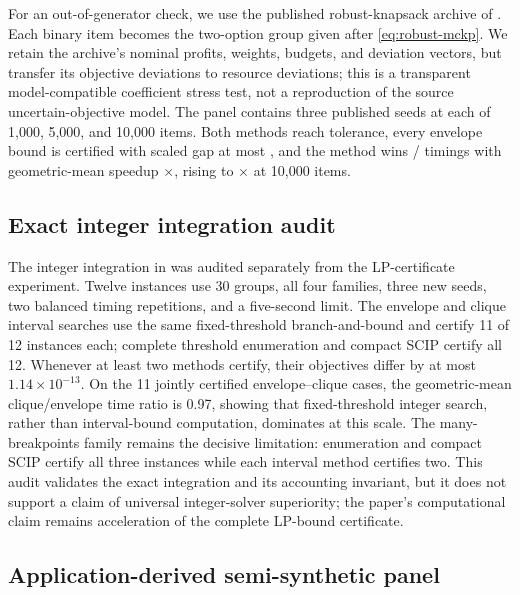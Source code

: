 \documentclass[11pt]{article}
\theoremstyle{plain}
\theoremstyle{definition}
\theoremstyle{remark}
\begin{document}
For an out-of-generator check, we use the published robust-knapsack archive of \citet{GersingData2022}.  Each binary item becomes the two-option group given after \eqref{eq:robust-mckp}.  We retain the archive's nominal profits, weights, budgets, and deviation vectors, but transfer its objective deviations to resource deviations; this is a transparent model-compatible coefficient stress test, not a reproduction of the source uncertain-objective model.  The panel contains three published seeds at each of 1,000, 5,000, and 10,000 items.  Both methods reach tolerance, every envelope bound is certified with scaled gap at most \PubExternalCertGap, and the method wins \PubExternalWins{}/\PubExternalCases{} timings with geometric-mean speedup \PubExternalGeoSpeedup$\times$, rising to \PubExternalNHighSpeedup$\times$ at 10,000 items.

\FloatBarrier

\subsection{Exact integer integration audit}

The integer integration in  was audited separately from the LP-certificate experiment.  Twelve instances use 30 groups, all four families, three new seeds, two balanced timing repetitions, and a five-second limit.  The envelope and clique interval searches use the same fixed-threshold branch-and-bound and certify 11 of 12 instances each; complete threshold enumeration and compact SCIP certify all 12.  Whenever at least two methods certify, their objectives differ by at most $1.14\times10^{-13}$.  On the 11 jointly certified envelope--clique cases, the geometric-mean clique/envelope time ratio is 0.97, showing that fixed-threshold integer search, rather than interval-bound computation, dominates at this scale.  The many-breakpoints family remains the decisive limitation: enumeration and compact SCIP certify all three instances while each interval method certifies two.  This audit validates the exact integration and its accounting invariant, but it does not support a claim of universal integer-solver superiority; the paper's computational claim remains acceleration of the complete LP-bound certificate.

\subsection{Application-derived semi-synthetic panel}
\end{document}
